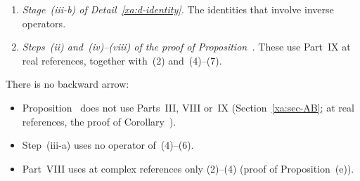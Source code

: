 \begin{detail}
\begin{enumerate}[label=(\arabic*)]
\item \emph{Stage~(iii-b) of Detail~\ref{xa:d-identity}.} The identities that involve inverse operators.
\item \emph{Steps~(ii) and~(iv)--(viii) of the proof of Proposition~.} These use Part~IX at real references, together with~(2) and~(4)--(7).
\end{enumerate}
There is no backward arrow:
\begin{itemize}
\item Proposition~ does not use Parts~III, VIII or~IX (Section~\ref{xa:sec-AB}; at real references, the proof of Corollary~).
\item Step~(iii-a) uses no operator of~(4)--(6).
\item Part~VIII uses at complex references only (2)--(4) (proof of Proposition~(e)).
\end{itemize}
\end{detail}

